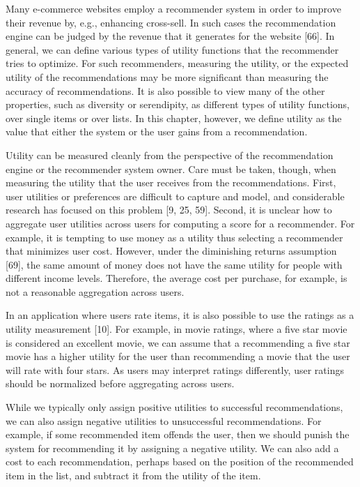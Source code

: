 Many e-commerce websites employ a recommender system in order to improve their revenue by, e.g., enhancing cross-sell. In such cases the recommendation engine can be judged by the revenue that it generates for the website [66]. In general, we can define various types of utility functions that the recommender tries to optimize. For such recommenders, measuring the utility, or the expected utility of the recommendations may be more significant than measuring the accuracy of recommendations. It is also possible to view many of the other properties, such as diversity or serendipity, as different types of utility functions, over single items or over lists. In this chapter, however, we define utility as the value that either the system or the user gains from a recommendation.

Utility can be measured cleanly from the perspective of the recommendation engine or the recommender system owner. Care must be taken, though, when measuring the utility that the user receives from the recommendations. First, user utilities or preferences are difficult to capture and model, and considerable research has focused on this problem [9, 25, 59]. Second, it is unclear how to aggregate user utilities across users for computing a score for a recommender. For example, it is tempting to use money as a utility thus selecting a recommender that minimizes user cost. However, under the diminishing returns assumption [69], the same amount of money does not have the same utility for people with different income levels. Therefore, the average cost per purchase, for example, is not a reasonable aggregation across users.

In an application where users rate items, it is also possible to use the ratings as a utility measurement [10]. For example, in movie ratings, where a five star movie is considered an excellent movie, we can assume that a recommending a five star movie has a higher utility for the user than recommending a movie that the user will rate with four stars. As users may interpret ratings differently, user ratings should be normalized before aggregating across users.

While we typically only assign positive utilities to successful recommendations, we can also assign negative utilities to unsuccessful recommendations. For example, if some recommended item offends the user, then we should punish the system for recommending it by assigning a negative utility. We can also add a cost to each recommendation, perhaps based on the position of the recommended item in the list, and subtract it from the utility of the item.

